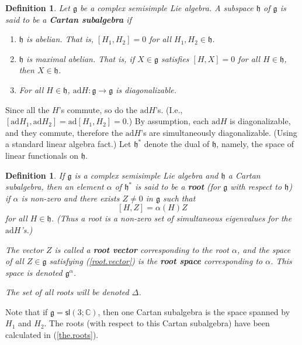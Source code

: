\documentclass[12pt]{amsbook}
\let \frak = \mathfrak
\theoremstyle{plain}
\newtheorem{definition}[theorem]{Definition}
\numberwithin{equation}{chapter}
\numberwithin{theorem}{chapter}
\begin{document}
\begin{definition}
Let $\frak{g}$ be a complex semisimple Lie algebra. A subspace $\frak{h}$ of
$\frak{g}$ is said to be a \textbf{Cartan subalgebra} if

\begin{enumerate}
\item $\frak{h}$ is abelian. That is, $\left[  H_{1},H_{2}\right]  =0$ for all
$H_{1},H_{2}\in\frak{h}$.

\item $\frak{h}$ is maximal abelian. That is, if $X\in\frak{g}$ satisfies
$\left[  H,X\right]  =0$ for all $H\in\frak{h}$, then $X\in\frak{h}$.

\item  For all $H\in\frak{h}$, $\mathrm{ad}H:\frak{g}\rightarrow\frak{g}$ is diagonalizable.
\end{enumerate}
\end{definition}

Since all the $H$'s commute, so do the $\mathrm{ad}H$'s. (I.e., $\left[
\mathrm{ad}H_{1},\mathrm{ad}H_{2}\right]  =\mathrm{ad}\left[  H_{1}%
,H_{2}\right]  =0$.) By assumption, each $\mathrm{ad}H$ is diagonalizable, and
they commute, therefore the $\mathrm{ad}H$'s are simultaneously
diagonalizable. (Using a standard linear algebra fact.) Let $\frak{h}^{*}$
denote the dual of $\frak{h}$, namely, the space of linear functionals on
$\frak{h}$.

\begin{definition}
If $\frak{g}$ is a complex semisimple Lie algebra and $\frak{h}$ a Cartan
subalgebra, then an element $\alpha$ of $\frak{h}^{\ast}$ is said to be a
\textbf{root} (for $\frak{g}$ with respect to $\frak{h}$) if $\alpha$ is
non-zero and there exists $Z\neq0$ in $\frak{g}$ such that
\begin{equation}
\left[  H,Z\right]  =\alpha(H)Z\label{root.vector}%
\end{equation}
for all $H\in\frak{h}$. (Thus a root is a non-zero set of simultaneous
eigenvalues for the $\mathrm{ad}H$'s.)

The vector $Z$ is called a \textbf{root vector} corresponding to the root
$\alpha$, and the space of all $Z\in\frak{g}$ satisfying (\ref{root.vector})
is the \textbf{root space} corresponding to $\alpha$. This space is denoted
$\frak{g}^{\alpha}$.

The set of all roots will be denoted $\Delta$.
\end{definition}

Note that if $\frak{g}=\mathsf{sl}\left(  3;\mathbb{C}\right)  $, then one
Cartan subalgebra is the space spanned by $H_{1}$ and $H_{2}$. The roots (with
respect to this Cartan subalgebra) have been calculated in (\ref{the.roots}).
\end{document}
